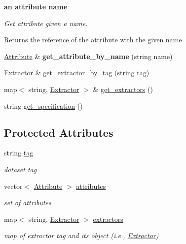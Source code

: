\begin{Indent}\textbf{ an attribute name}\par
{\em Get attribute given a name.

\begin{DoxyReturn}{Returns}
the reference of the attribute with the given name 
\end{DoxyReturn}
}\begin{DoxyCompactItemize}
\item 
\mbox{\label{classSet_a6ddd20a1f9068ca0963d9c67dbdef8c4}} 
\hyperlink{classAttribute}{Attribute} \& {\bfseries get\+\_\+attribute\+\_\+by\+\_\+name} (string name)
\item 
\hyperlink{classExtractor}{Extractor} \& \hyperlink{classSet_a06405b0e497db65bf526a6be9a589523}{get\+\_\+extractor\+\_\+by\+\_\+tag} (string \hyperlink{classSet_a35ba1a3d7f2fd99f7b98985b97cdd95d}{tag})
\item 
map$<$ string, \hyperlink{classExtractor}{Extractor} $>$ \& \hyperlink{classSet_a8638f2a95600d52c334414723afc414d}{get\+\_\+extractors} ()
\item 
string \hyperlink{classSet_aaa0aca15b56a82a4bcf803aeeb27c842}{get\+\_\+specification} ()
\end{DoxyCompactItemize}
\end{Indent}
\subsection*{Protected Attributes}
\begin{DoxyCompactItemize}
\item 
\mbox{\label{classSet_a35ba1a3d7f2fd99f7b98985b97cdd95d}} 
string \hyperlink{classSet_a35ba1a3d7f2fd99f7b98985b97cdd95d}{tag}
\begin{DoxyCompactList}\small\item\em dataset tag \end{DoxyCompactList}\item 
\mbox{\label{classSet_ad95bfeca2b9cb7aecbdb01e8bfc860dd}} 
vector$<$ \hyperlink{classAttribute}{Attribute} $>$ \hyperlink{classSet_ad95bfeca2b9cb7aecbdb01e8bfc860dd}{attributes}
\begin{DoxyCompactList}\small\item\em set of attributes \end{DoxyCompactList}\item 
\mbox{\label{classSet_a99bb877788be2f6afe24d8f775a64e33}} 
map$<$ string, \hyperlink{classExtractor}{Extractor} $>$ \hyperlink{classSet_a99bb877788be2f6afe24d8f775a64e33}{extractors}
\begin{DoxyCompactList}\small\item\em map of extractor tag and its object (i.\+e., \hyperlink{classExtractor}{Extractor}) \end{DoxyCompactList}\end{DoxyCompactItemize}


